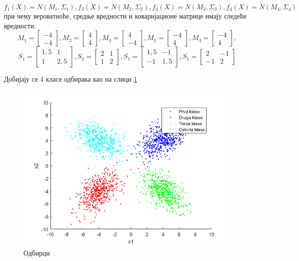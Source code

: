 $$f_1(X) = N(M_{1}, \Sigma_{1}), f_2(X) = N(M_{2}, \Sigma_{2}), f_3(X) = N(M_{3}, \Sigma_{3}),f_4(X) = N(M_{4}, \Sigma_{4})$$
при чему вероватноће, средње вредности и коваријационе матрице имају следеће вредности:
$$ M_{1} = \begin{bmatrix}
   -4\\
   -4
\end{bmatrix}, 
 M_{2} = \begin{bmatrix}
   4\\
   4
\end{bmatrix}, 
 M_{3} = \begin{bmatrix}
   4\\
   -4
\end{bmatrix}, 
 M_{1} = \begin{bmatrix}
   -4\\
   4
\end{bmatrix}, 
 M_{4} = \begin{bmatrix}
   -4\\
   4
\end{bmatrix}, 
$$				
$$S_{1} = \begin{bmatrix}
				   1,5 & 1\\
				   1 & 2,5
				\end{bmatrix},
S_{2} = \begin{bmatrix}
	2 & 1\\
	1 & 2
\end{bmatrix},
S_{1} = \begin{bmatrix}
	1,5 & -1\\
	-1 & 1,5
\end{bmatrix},
S_{1} = \begin{bmatrix}
	2 & -1\\
	-1 & 2
\end{bmatrix}$$

\renewcommand{\lstlistingname}{Одсечак кода}%
Добијају се 4 класе одбирака као на слици \ref{fig:Odbirci}
\begin{figure}[htb!]
\includegraphics[scale=.8]{pictures/4/Odbirci}
\caption{Одбирци}\label{fig:Odbirci}
\end{figure}

